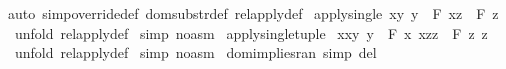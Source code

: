 \begin{isabellebody}
%
\isadelimproof
%
\endisadelimproof
%
\isatagproof
{}\isamarkupfalse%
{\isacharparenleft}auto\ simp{\isacharcolon}override{\isacharunderscore}def\ dom{\isacharunderscore}substr{\isacharunderscore}def\ rel{\isacharunderscore}apply{\isacharunderscore}def{\isacharparenright}%
\endisatagproof
{\isafoldproof}%
%
\isadelimproof
\isanewline
%
\endisadelimproof
\isanewline
\isanewline
{}\isamarkupfalse%
\ apply{\isacharunderscore}single{\isacharcolon}\ {\isachardoublequoteopen}{\isacharparenleft}{\isacharbraceleft}{\isacharparenleft}x{\isacharcomma}y{\isacharparenright}{\isachardot}\ y\ {\isacharequal}\ F\ x{\isacharbraceright}{\isacharpercent}{\isacharcircum}z{\isacharparenright}\ {\isacharequal}\ {\isacharparenleft}F\ z{\isacharparenright}{\isachardoublequoteclose}\isanewline
%
\isadelimproof
%
\endisadelimproof
%
\isatagproof
{}\isamarkupfalse%
\ {\isacharparenleft}unfold\ rel{\isacharunderscore}apply{\isacharunderscore}def{\isacharparenright}\isanewline
{}\isamarkupfalse%
\ {\isacharparenleft}simp\ {\isacharparenleft}no{\isacharunderscore}asm{\isacharparenright}{\isacharparenright}\isanewline
{}\isamarkupfalse%
%
\endisatagproof
{\isafoldproof}%
%
\isadelimproof
\isanewline
%
\endisadelimproof
\isanewline
{}\isamarkupfalse%
\ apply{\isacharunderscore}single{\isacharunderscore}tuple{\isacharcolon}\ \isanewline
{\isachardoublequoteopen}{\isacharparenleft}{\isacharbraceleft}{\isacharparenleft}{\isacharparenleft}x{}{\isacharcomma}x{}{\isacharparenright}{\isacharcomma}y{\isacharparenright}{\isachardot}\ {\isacharparenleft}y\ {\isacharequal}\ {\isacharparenleft}F\ x{}\ x{}{\isacharparenright}{\isacharparenright}{\isacharbraceright}{\isacharpercent}{\isacharcircum}{\isacharparenleft}z{}{\isacharcomma}z{}{\isacharparenright}{\isacharparenright}\ {\isacharequal}\ {\isacharparenleft}F\ z{}\ z{}{\isacharparenright}{\isachardoublequoteclose}\isanewline
%
\isadelimproof
%
\endisadelimproof
%
\isatagproof
{}\isamarkupfalse%
\ {\isacharparenleft}unfold\ rel{\isacharunderscore}apply{\isacharunderscore}def{\isacharparenright}\isanewline
{}\isamarkupfalse%
\ {\isacharparenleft}simp\ {\isacharparenleft}no{\isacharunderscore}asm{\isacharparenright}{\isacharparenright}\isanewline
{}\isamarkupfalse%
%
\endisatagproof
{\isafoldproof}%
%
\isadelimproof
\isanewline
%
\endisadelimproof
\isanewline
{}\isamarkupfalse%
\ dom{\isacharunderscore}implies{\isacharunderscore}ran\ {\isacharbrackleft}simp\ del{\isacharbrackright}\isanewline

\end{isabellebody}

